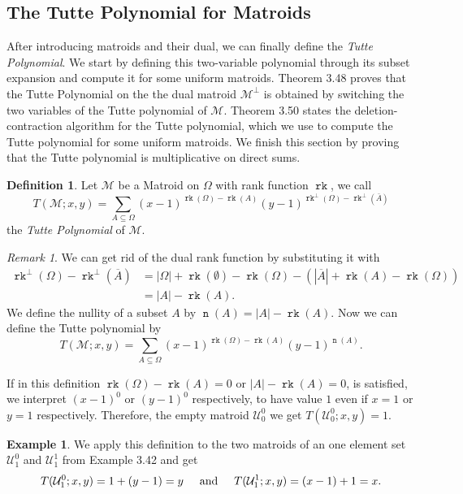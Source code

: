 \documentclass[12pt,a4paper, twoside, autooneside=false]{scrartcl}
\theoremstyle{definition}
\newtheorem{definition}[theorem]{Definition}
\newtheorem{beispiel}[theorem]{Example}
\theoremstyle{remark}
\newtheorem{remark}[theorem]{Remark}
\numberwithin{equation}{section}
\DeclareMathOperator{\rk}{\mathtt{rk}}
\DeclareMathOperator{\n}{\mathtt{n}}
\newcommand{\M}{\mathcal{M}} %
\begin{document}
\subsection{The Tutte Polynomial for Matroids}
After introducing matroids and their dual, we can finally define the \textit{Tutte Polynomial}. We start by defining this two-variable polynomial through its subset expansion and compute it for some uniform matroids. Theorem 3.48 proves that the Tutte Polynomial on the the dual matroid $\M^\perp$ is obtained by switching the two variables of the Tutte polynomial of $\M$. Theorem 3.50 states the deletion-contraction algorithm for the Tutte polynomial, which we use to compute the Tutte polynomial for some uniform matroids. We finish this section by proving that the Tutte polynomial is multiplicative on direct sums.
\begin{definition}
Let $\M$ be a Matroid on $\Omega$ with rank function $\rk$, we call
\[
T(\M; x,y) = \sum_{A \subseteq \Omega} (x - 1)^{\rk(\Omega) - \rk(A)} (y - 1)^{\rk^\perp(\Omega) - \rk^\perp(\bar{A})}
\]
the \textit{Tutte Polynomial} of $\M$. 
\end{definition}
\begin{remark}
We can get rid of the dual rank function by substituting it with
\begin{align*}
\rk^\perp(\Omega) - \rk^\perp(\overline{A}) &= |\Omega| + \rk(\emptyset) - \rk(\Omega) - (|\overline{A}| + \rk(A) - \rk(\Omega)) \\ 
&= |A| - \rk(A). 
\end{align*}
We define the nullity of a subset $A$ by $\n(A) = |A| - \rk(A)$. Now we can define the Tutte polynomial by 
\[
T(\M; x,y) = \sum_{A \subseteq \Omega}(x - 1)^{\rk(\Omega) - \rk(A)}(y - 1)^{\n(A)}.
\]
\end{remark} 
If in this definition $\rk(\Omega) - \rk(A)= 0$ or $|A| - \rk(A) = 0$, is satisfied, we interpret $(x - 1)^0$ or $(y - 1)^0$ respectively, to have value $1$ even if $x = 1$ or $y = 1$ respectively. Therefore, the empty matroid $\mathcal{U}_0^0$ we get $T(\mathcal{U}_0^0; x,y) = 1$.
\begin{beispiel} We apply this definition to the two matroids of an one element set $\mathcal{U}_1^0$ and $\mathcal{U}_1^1$ from Example 3.42 and get 
\[
T(\mathcal{U}_1^0;x,y) = 1 + (y - 1) = y \hspace*{0,5cm} \text{and} \hspace*{0,5cm} T(\mathcal{U}_1^1; x,y) = (x - 1) + 1 = x.
\]
\end{beispiel}
\end{document}
